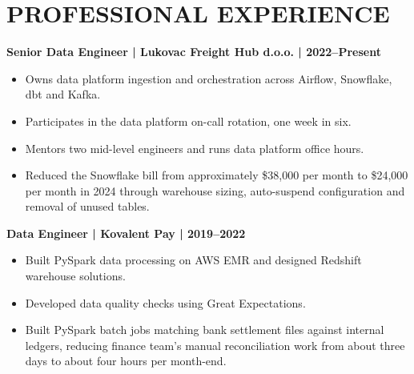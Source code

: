 \documentclass[11pt,a4paper]{article}
\begin{document}
\section*{PROFESSIONAL EXPERIENCE}
\textbf{Senior Data Engineer | Lukovac Freight Hub d.o.o. | 2022--Present}
\begin{itemize}
\item Owns data platform ingestion and orchestration across Airflow, Snowflake, dbt and Kafka.
\item Participates in the data platform on-call rotation, one week in six.
\item Mentors two mid-level engineers and runs data platform office hours.
\item Reduced the Snowflake bill from approximately \$38,000 per month to \$24,000 per month in 2024 through warehouse sizing, auto-suspend configuration and removal of unused tables.
\end{itemize}
\textbf{Data Engineer | Kovalent Pay | 2019--2022}
\begin{itemize}
\item Built PySpark data processing on AWS EMR and designed Redshift warehouse solutions.
\item Developed data quality checks using Great Expectations.
\item Built PySpark batch jobs matching bank settlement files against internal ledgers, reducing finance team's manual reconciliation work from about three days to about four hours per month-end.
\end{itemize}
\end{document}
